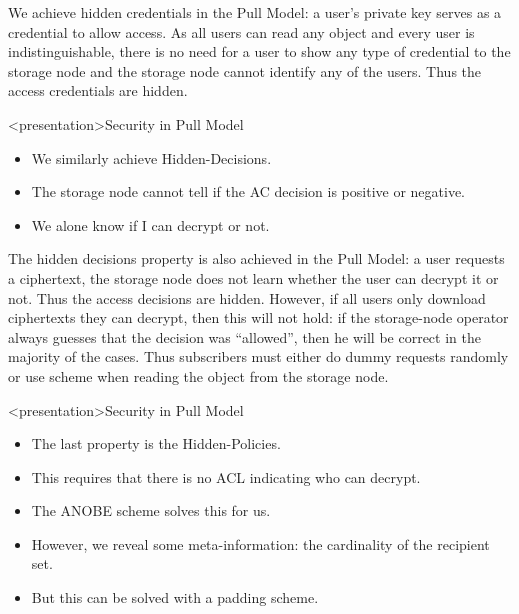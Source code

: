 We achieve hidden credentials in the Pull Model: a user's private key serves as 
a credential to allow access.
As all users can read any object and every user is indistinguishable, there is 
no need for a user to show any type of credential to the storage node and the 
storage node cannot identify any of the users.
Thus the access credentials are hidden.

\begin{frame}<presentation>{Security in Pull Model}
  \begin{itemize}

    \item We similarly achieve Hidden-Decisions.

    \item The storage node cannot tell if the \ac{AC} decision is positive or 
      negative.

    \item We alone know if I can decrypt or not.

  \end{itemize}
\end{frame}

The hidden decisions property is also achieved in the Pull Model: a user 
requests a ciphertext, the storage node does not learn whether the user can 
decrypt it or not.
Thus the access decisions are hidden.
However, if all users only download ciphertexts they can decrypt, then this 
will not hold:
if the storage-node operator always guesses that the decision was 
\enquote{allowed}, then he will be correct in the majority of the cases.
Thus subscribers must either do dummy requests randomly or use  scheme 
when reading the object from the storage node.

\begin{frame}<presentation>{Security in Pull Model}
  \begin{itemize}

    \item The last property is the Hidden-Policies.
      
    \item This requires that there is no \ac{ACL} indicating who can decrypt.

    \item The \ac{ANOBE} scheme solves this for us.

      \pause{}

    \item However, we reveal some meta-information: the cardinality of the 
      recipient set.

    \item But this can be solved with a padding scheme.

  \end{itemize}
\end{frame}


